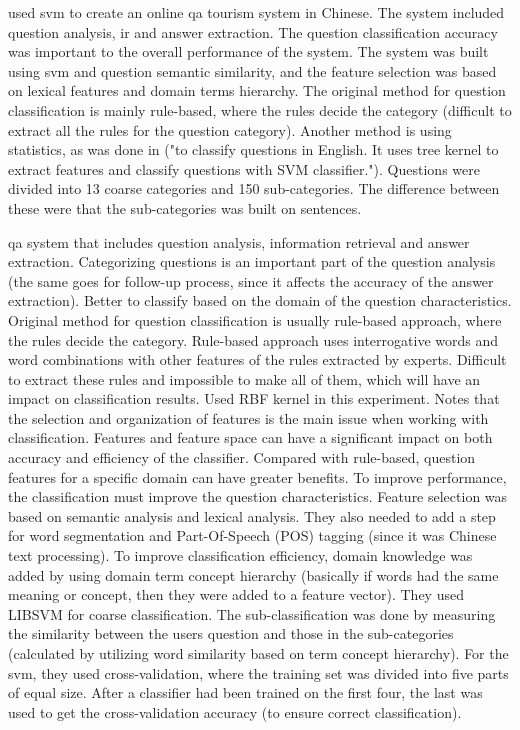 \textcite{Xu2012} used \gls{svm} to create an online \gls{qa} tourism system in Chinese. 
The system included question analysis, \gls{ir} and answer extraction. 
The question classification accuracy was important to the overall performance of the system. 
The system was built using \gls{svm} and question semantic similarity, and the feature selection was based on lexical features and domain terms hierarchy. 
The original method for question classification is mainly rule-based, where the rules decide the category (difficult to extract all the rules for the question category). 
Another method is using statistics, as was done in \cite{Zhang2003} ("to classify questions in English. It uses tree kernel to extract features and classify questions with SVM classifier."). 
Questions were divided into 13 coarse categories and 150 sub-categories. 
The difference between these were that the sub-categories was built on sentences.
\textcite{Xu2012}

\gls{qa} system that includes question analysis, information retrieval and answer extraction.
Categorizing questions is an important part of the question analysis (the same goes for follow-up process, since it affects the accuracy of the answer extraction).
Better to classify based on the domain of the question characteristics. 
Original method for question classification is usually rule-based approach, where the rules decide the category. 
Rule-based approach uses interrogative words and word combinations with other features of the rules extracted by experts. 
Difficult to extract these rules and impossible to make all of them, which will have an impact on classification results. 
Used RBF kernel in this experiment. 
Notes that the selection and organization of features is the main issue when working with classification. 
Features and feature space can have a significant impact on both accuracy and efficiency of the classifier. 
Compared with rule-based, question features for a specific domain can have greater benefits. 
To improve performance, the classification must improve the question characteristics. 
Feature selection was based on semantic analysis and lexical analysis. 
They also needed to add a step for word segmentation and Part-Of-Speech (POS) tagging (since it was Chinese text processing). 
To improve classification efficiency, domain knowledge was added by using domain term concept hierarchy (basically if words had the same meaning or concept, then they were added to a feature vector). 
They used LIBSVM for coarse classification. 
The sub-classification was done by measuring the similarity between the users question and those in the sub-categories  (calculated by utilizing word similarity based on term concept hierarchy). 
For the \gls{svm}, they used cross-validation, where the training set was divided into five parts of equal size. 
After a classifier had been trained on the first four, the last was used to get the cross-validation accuracy (to ensure correct classification).
\cite{Xu2012}


